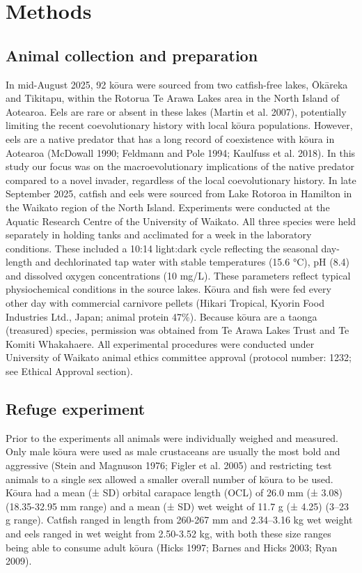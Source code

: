 \documentclass[
  12pt,
  a4paper,
  oneside]{scrbook}
\begin{document}
\section{Methods}\label{methods}

\subsection{Animal collection and
preparation}\label{animal-collection-and-preparation}

In mid-August 2025, 92 kōura were sourced from two catfish-free lakes,
Ōkāreka and Tikitapu, within the Rotorua Te Arawa Lakes area in the
North Island of Aotearoa. Eels are rare or absent in these lakes (Martin
et al. 2007), potentially limiting the recent coevolutionary history
with local kōura populations. However, eels are a native predator that
has a long record of coexistence with kōura in Aotearoa (McDowall 1990;
Feldmann and Pole 1994; Kaulfuss et al. 2018). In this study our focus
was on the macroevolutionary implications of the native predator
compared to a novel invader, regardless of the local coevolutionary
history. In late September 2025, catfish and eels were sourced from Lake
Rotoroa in Hamilton in the Waikato region of the North Island.
Experiments were conducted at the Aquatic Research Centre of the
University of Waikato. All three species were held separately in holding
tanks and acclimated for a week in the laboratory conditions. These
included a 10:14 light:dark cycle reflecting the seasonal day-length and
dechlorinated tap water with stable temperatures (15.6 °C), pH (8.4) and
dissolved oxygen concentrations (10 mg/L). These parameters reflect
typical physiochemical conditions in the source lakes. Kōura and fish
were fed every other day with commercial carnivore pellets (Hikari
Tropical, Kyorin Food Industries Ltd., Japan; animal protein 47\%).
Because kōura are a taonga (treasured) species, permission was obtained
from Te Arawa Lakes Trust and Te Komiti Whakahaere. All experimental
procedures were conducted under University of Waikato animal ethics
committee approval (protocol number: 1232; see Ethical Approval
section).

\subsection{Refuge experiment}\label{refuge-experiment}

Prior to the experiments all animals were individually weighed and
measured. Only male kōura were used as male crustaceans are usually the
most bold and aggressive (Stein and Magnuson 1976; Figler et al. 2005)
and restricting test animals to a single sex allowed a smaller overall
number of kōura to be used. Kōura had a mean (± SD) orbital carapace
length (OCL) of 26.0 mm (± 3.08) (18.35-32.95 mm range) and a mean (±
SD) wet weight of 11.7 g (± 4.25) (3--23 g range). Catfish ranged in
length from 260-267 mm and 2.34--3.16 kg wet weight and eels ranged in
wet weight from 2.50-3.52 kg, with both these size ranges being able to
consume adult kōura (Hicks 1997; Barnes and Hicks 2003; Ryan 2009).
\end{document}
